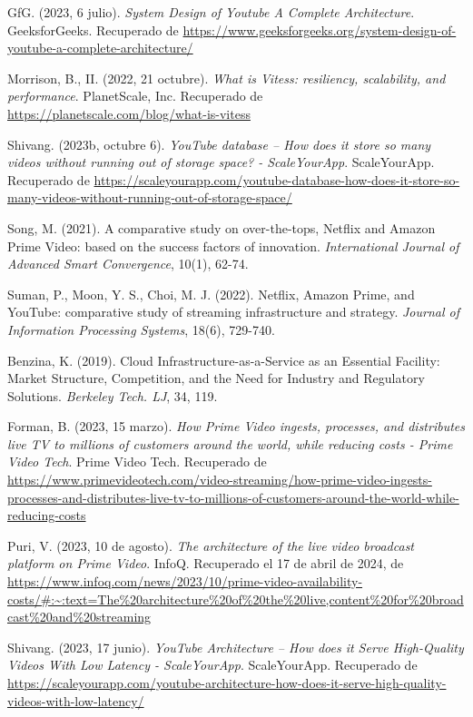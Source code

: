 \documentclass[12pt,a4paper]{article}
\begin{document}
\begin{thebibliography}{99}
GfG. (2023, 6 julio). \textit{System Design of Youtube A Complete Architecture}. GeeksforGeeks. Recuperado de \url{https://www.geeksforgeeks.org/system-design-of-youtube-a-complete-architecture/}

Morrison, B., II. (2022, 21 octubre). \textit{What is Vitess: resiliency, scalability, and performance}. PlanetScale, Inc. Recuperado de \url{https://planetscale.com/blog/what-is-vitess}

Shivang. (2023b, octubre 6). \textit{YouTube database – How does it store so many videos without running out of storage space? - ScaleYourApp}. ScaleYourApp. Recuperado de \url{https://scaleyourapp.com/youtube-database-how-does-it-store-so-many-videos-without-running-out-of-storage-space/}

Song, M. (2021). A comparative study on over-the-tops, Netflix and Amazon Prime Video: based on the success factors of innovation. \textit{International Journal of Advanced Smart Convergence}, 10(1), 62-74.

Suman, P., Moon, Y. S.,  Choi, M. J. (2022). Netflix, Amazon Prime, and YouTube: comparative study of streaming infrastructure and strategy. \textit{Journal of Information Processing Systems}, 18(6), 729-740.

Benzina, K. (2019). Cloud Infrastructure-as-a-Service as an Essential Facility: Market Structure, Competition, and the Need for Industry and Regulatory Solutions. \textit{Berkeley Tech. LJ}, 34, 119.

Forman, B. (2023, 15 marzo). \textit{How Prime Video ingests, processes, and distributes live TV to millions of customers around the world, while reducing costs - Prime Video Tech}. Prime Video Tech. Recuperado de \url{https://www.primevideotech.com/video-streaming/how-prime-video-ingests-processes-and-distributes-live-tv-to-millions-of-customers-around-the-world-while-reducing-costs}

Puri, V. (2023, 10 de agosto). \textit{The architecture of the live video broadcast platform on Prime Video}. InfoQ. Recuperado el 17 de abril de 2024, de \url{https://www.infoq.com/news/2023/10/prime-video-availability-costs/#:~:text=The%20architecture%20of%20the%20live,content%20for%20broadcast%20and%20streaming}

Shivang. (2023, 17 junio). \textit{YouTube Architecture – How does it Serve High-Quality Videos With Low Latency - ScaleYourApp}. ScaleYourApp. Recuperado de \url{https://scaleyourapp.com/youtube-architecture-how-does-it-serve-high-quality-videos-with-low-latency/}




\end{thebibliography}
\end{document}
